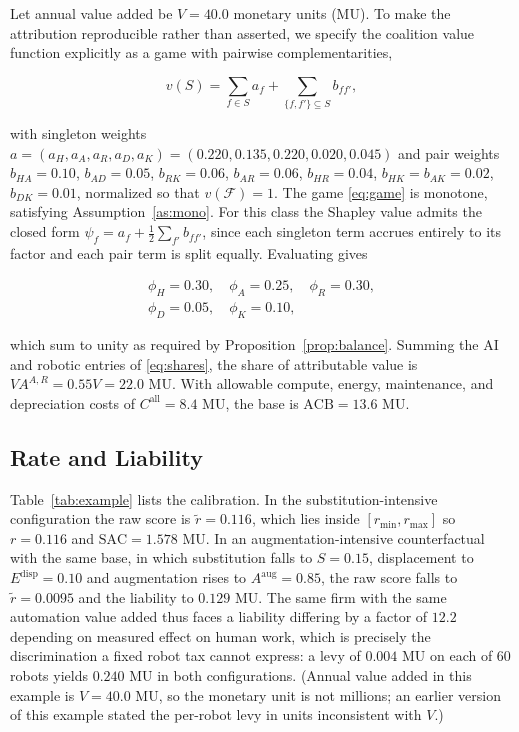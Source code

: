 \documentclass[journal]{IEEEtran}
\theoremstyle{plain}
\theoremstyle{definition}
\newcommand{\ACB}{\mathrm{ACB}}
\newcommand{\SAC}{\mathrm{SAC}}
\begin{document}
Let annual value added be $V = 40.0$ monetary units (MU). To make the attribution reproducible rather than asserted, we specify the coalition value function explicitly as a game with pairwise complementarities,

\begin{equation}
\label{eq:game}
v(S) = \sum_{f\in S} a_f + \!\!\sum_{\{f,f'\}\subseteq S}\!\! b_{ff'},
\end{equation}

with singleton weights $a = (a_H,a_A,a_R,a_D,a_K) = (0.220, 0.135, 0.220, 0.020, 0.045)$ and pair weights $b_{HA}=0.10$, $b_{AD}=0.05$, $b_{RK}=0.06$, $b_{AR}=0.06$, $b_{HR}=0.04$, $b_{HK}=b_{AK}=0.02$, $b_{DK}=0.01$, normalized so that $v(\mathcal{F})=1$. The game \eqref{eq:game} is monotone, satisfying Assumption~\ref{as:mono}. For this class the Shapley value admits the closed form $\psi_f = a_f + \tfrac{1}{2}\sum_{f'} b_{ff'}$, since each singleton term accrues entirely to its factor and each pair term is split equally. Evaluating gives

\begin{equation}
\label{eq:shares}
\begin{split}
\phi_H = 0.30,\quad \phi_A = 0.25,\quad \phi_R = 0.30,\\
\phi_D = 0.05,\quad \phi_K = 0.10,
\end{split}
\end{equation}

which sum to unity as required by Proposition~\ref{prop:balance}. Summing the AI and robotic entries of \eqref{eq:shares}, the share of attributable value is $VA^{A,R} = 0.55V = 22.0$ MU. With allowable compute, energy, maintenance, and depreciation costs of $C^{\mathrm{all}} = 8.4$ MU, the base is $\ACB = 13.6$ MU.

\subsection{Rate and Liability}

Table~\ref{tab:example} lists the calibration. In the substitution-intensive configuration the raw score is $\tilde r = 0.116$, which lies inside $[r_{\min},r_{\max}]$ so $r = 0.116$ and $\SAC = 1.578$ MU. In an augmentation-intensive counterfactual with the same base, in which substitution falls to $S = 0.15$, displacement to $E^{\mathrm{disp}} = 0.10$ and augmentation rises to $A^{\mathrm{aug}} = 0.85$, the raw score falls to $\tilde r = 0.0095$ and the liability to $0.129$ MU. The same firm with the same automation value added thus faces a liability differing by a factor of $12.2$ depending on measured effect on human work, which is precisely the discrimination a fixed robot tax cannot express: a levy of $0.004$ MU on each of 60 robots yields $0.240$ MU in both configurations. (Annual value added in this example is $V = 40.0$ MU, so the monetary unit is not millions; an earlier version of this example stated the per-robot levy in units inconsistent with $V$.)
\end{document}
